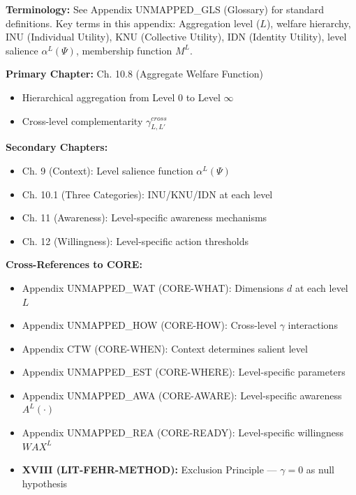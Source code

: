 
\begin{tcolorbox}[colback=gray!5!white, colframe=gray!50!black]
\textbf{Terminology:} See Appendix UNMAPPED_GLS (Glossary) for standard definitions.
Key terms in this appendix: Aggregation level ($L$), welfare hierarchy,
INU (Individual Utility), KNU (Collective Utility), IDN (Identity Utility),
level salience $\alpha^L(\Psi)$, membership function $M^L$.
\end{tcolorbox}

\begin{tcolorbox}[colback=green!5!white, colframe=green!75!black,
    title=\textbf{Chapter References}]

\textbf{Primary Chapter:} Ch. 10.8 (Aggregate Welfare Function)
\begin{itemize}[nosep]
    \item Hierarchical aggregation from Level 0 to Level $\infty$
    \item Cross-level complementarity $\gamma^{cross}_{L,L'}$
\end{itemize}

\textbf{Secondary Chapters:}
\begin{itemize}[nosep]
    \item Ch. 9 (Context): Level salience function $\alpha^L(\Psi)$
    \item Ch. 10.1 (Three Categories): INU/KNU/IDN at each level
    \item Ch. 11 (Awareness): Level-specific awareness mechanisms
    \item Ch. 12 (Willingness): Level-specific action thresholds
\end{itemize}

\textbf{Cross-References to CORE:}
\begin{itemize}[nosep]
    \item Appendix UNMAPPED_WAT (CORE-WHAT): Dimensions $d$ at each level $L$
    \item Appendix UNMAPPED_HOW (CORE-HOW): Cross-level $\gamma$ interactions
    \item Appendix CTW (CORE-WHEN): Context determines salient level
    \item Appendix UNMAPPED_EST (CORE-WHERE): Level-specific parameters
    \item Appendix UNMAPPED_AWA (CORE-AWARE): Level-specific awareness $A^L(\cdot)$
    \item Appendix UNMAPPED_REA (CORE-READY): Level-specific willingness $WAX^L$
    \item \textbf{XVIII (LIT-FEHR-METHOD):} Exclusion Principle --- $\gamma = 0$ as null hypothesis
\end{itemize}

\end{tcolorbox}

